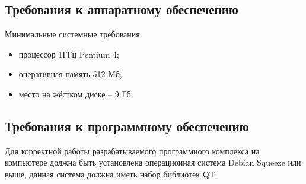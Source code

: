 \subsection {Требования к аппаратному обеспечению}

Минимальные системные требования:

\begin{itemize}
\item процессор 1ГГц Pentium 4;
\item оперативная память 512 Мб;
\item место на жёстком диске -- 9 Гб.
\end{itemize}

\subsection {Требования к программному обеспечению}
Для корректной работы разрабатываемого программного комплекса на компьютере должна быть установлена операционная система Debian Squeeze или выше, данная система должна иметь набор библиотек QT.

